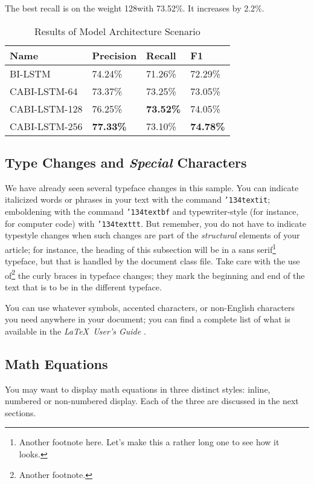 The best recall is on the weight 128with 73.52\%. It increases by 2.2\%.

\begin{table}
	\caption{Results of Model Architecture Scenario}
	\label{tab:architecure_scenario}
	\begin{tabular}{llll}
		\toprule
		Name			&Precision					&Recall		&F1			\\
		\midrule
		BI-LSTM				&	74.24\%				&	71.26\%				&	72.29\%	\\
		CABI-LSTM-64		&	73.37\%				&	73.25\%				&	73.05\%	\\
		CABI-LSTM-128		&	76.25\%				&	\textbf{73.52\%}	&	74.05\%	\\
		CABI-LSTM-256		&	\textbf{77.33\%}	&	73.10\%				&	\textbf{74.78\%}\\
		\bottomrule
	\end{tabular}
\end{table}


\subsection{Type Changes and {\itshape Special} Characters}

We have already seen several typeface changes in this sample.  You can
indicate italicized words or phrases in your text with the command
\texttt{{\char'134}textit}; emboldening with the command
\texttt{{\char'134}textbf} and typewriter-style (for instance, for
computer code) with \texttt{{\char'134}texttt}.  But remember, you do
not have to indicate typestyle changes when such changes are part of
the \textit{structural} elements of your article; for instance, the
heading of this subsection will be in a sans serif\footnote{Another
  footnote here.  Let's make this a rather long one to see how it
  looks.} typeface, but that is handled by the document class file.
Take care with the use of\footnote{Another footnote.}  the
curly braces in typeface changes; they mark the beginning and end of
the text that is to be in the different typeface.

You can use whatever symbols, accented characters, or non-English
characters you need anywhere in your document; you can find a complete
list of what is available in the \textit{\LaTeX\ User's Guide}
\cite{Lamport:LaTeX}.

\subsection{Math Equations}
You may want to display math equations in three distinct styles:
inline, numbered or non-numbered display.  Each of
the three are discussed in the next sections.

